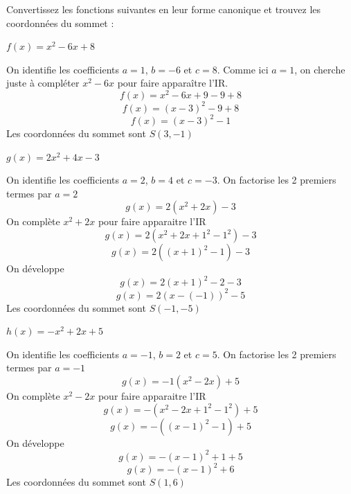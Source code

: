 \documentclass[11pt,a4paper]{article}  %
\begin{document}
Convertissez les fonctions suivantes en leur forme canonique et trouvez les coordonnées du sommet :
\begin{enumMet}
	\item \( f(x) = x^2 - 6x + 8 \)
	\begin{corrBox}
		On identifie les coefficients $a = 1$, $b = -6$ et $c = 8$.
		Comme ici $a = 1$, on cherche juste à compléter $x^2 - 6x$ pour faire apparaître l'IR.
		$$f(x) = x^2 - 6x + 9 - 9 + 8$$
		$$f(x) = (x - 3)^2 - 9 + 8$$
		$$f(x) = (x - 3)^2 - 1$$
		Les coordonnées du sommet sont $S(3, -1)$	
	\end{corrBox}
	\item \( g(x) = 2x^2 + 4x - 3 \)
	\begin{corrBox}
		On identifie les coefficients $a = 2$, $b = 4$ et $c = -3$.
		On factorise les 2 premiers termes par $a = 2$
		$$g(x)=2(x^2+2x)-3$$
		On complète $x^2+2x$ pour faire apparaitre l'IR
 		$$g(x) = 2(x^2+2x+1^2-1^2)-3$$
		$$g(x) = 2((x + 1 )^2 - 1) -3$$
		On développe
		$$g(x) = 2(x +1)^2 - 2-3$$
		$$g(x) = 2(x -(-1))^2 - 5$$
		Les coordonnées du sommet sont $S(-1, -5)$	
	\end{corrBox}
	\item \( h(x) = -x^2 + 2x + 5 \)
	\begin{corrBox}
		On identifie les coefficients $a = -1$, $b = 2$ et $c = 5$.
		On factorise les 2 premiers termes par $a = -1$
		$$g(x)=-1(x^2-2x)+5$$
		On complète $x^2-2x$ pour faire apparaitre l'IR
		$$g(x) = -(x^2-2x+1^2-1^2)+5$$
		$$g(x) = -((x - 1 )^2 - 1) +5$$
		On développe
		$$g(x) = -(x -1)^2 +1+5$$
		$$g(x) = -(x -1)^2 +6$$
		Les coordonnées du sommet sont $S(1, 6)$	
	\end{corrBox}
\end{enumMet}
\end{document}
